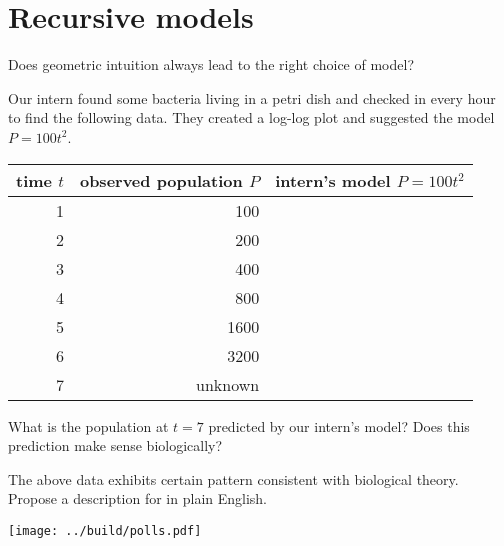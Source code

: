 \documentclass[../main.tex]{subfiles}
\begin{document}
 \section{Recursive models}

Does geometric intuition always lead to the right choice of model?

\begin{example} \label{ex:intro-population}
  Our intern found some bacteria living in a petri dish and checked in every hour to find the following data. They created a log-log plot and suggested the model \(P = 100 t^{2}\). 

  \begin{minipage}{0.65\textwidth}
    \centering
    \begin{tabular}{r|r|l}
      time \(t\)  & observed population \(P\) & intern's model \(P = 100 t^{2}\) \\ \midrule
      1 & 100     & \\ \midrule
      2 & 200     & \\ \midrule
      3 & 400     & \\ \midrule
      4 & 800     & \\ \midrule
      5 & 1600    & \\ \midrule
      6 & 3200    & \\ \midrule
      7 & unknown &  
    \end{tabular}
  \end{minipage}
  \begin{minipage}{0.3\textwidth}
    \centering
  \end{minipage}

  \faComment{} What is the population at \(t = 7\) predicted by our intern's model? Does this prediction make sense biologically?

  The above data exhibits certain pattern consistent with biological theory. Propose a description for  in plain English.

  \texttt{[image: ../build/polls.pdf]}

\end{example}
\clearpage
\end{document}
